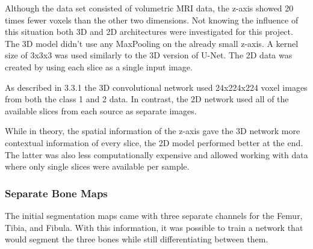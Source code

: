Although the data set consisted of volumetric MRI data, the z-axis showed 20 times fewer voxels than the other two dimensions. Not knowing the influence of this situation both 3D and 2D architectures were investigated for this project. The 3D model didn't use any MaxPooling on the already small z-axis. A kernel size of 3x3x3 was used similarly to the 3D version of U-Net. The 2D data was created by using each slice as a single input image.

As described in 3.3.1 the 3D convolutional network used 24x224x224 voxel images from both the class 1 and 2 data. In contrast, the 2D network used all of the available slices from each source as separate images.

While in theory, the spatial information of the z-axis gave the 3D network more contextual information of every slice, the 2D model performed better at the end. The latter was also less computationally expensive and allowed working with data where only single slices were available per sample.

\subsubsection{Separate Bone Maps}

The initial segmentation maps came with three separate channels for the Femur, Tibia, and Fibula. With this information, it was possible to train a network that would segment the three bones while still differentiating between them.

